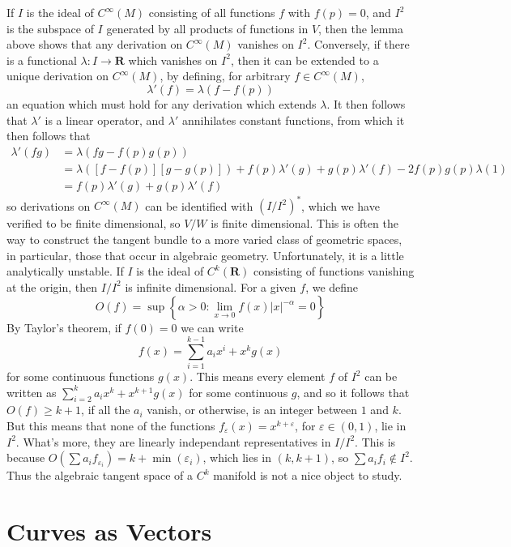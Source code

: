 If $I$ is the ideal of $C^\infty(M)$ consisting of all functions $f$ with $f(p) = 0$, and $I^2$ is the subspace of $I$ generated by all products of functions in $V$, then the lemma above shows that any derivation on $C^\infty(M)$ vanishes on $I^2$. Conversely, if there is a functional $\lambda: I \to \mathbf{R}$ which vanishes on $I^2$, then it can be extended to a unique derivation on $C^\infty(M)$, by defining, for arbitrary $f \in C^\infty(M)$,
%
\[ \lambda'(f) = \lambda(f - f(p)) \]
%
an equation which must hold for any derivation which extends $\lambda$. It then follows that $\lambda'$ is a linear operator, and $\lambda'$ annihilates constant functions, from which it then follows that
%
\begin{align*}
    \lambda'(fg) &= \lambda(fg - f(p)g(p))\\
    &= \lambda([f - f(p)][g - g(p)]) + f(p) \lambda'(g) + g(p) \lambda'(f) - 2 f(p) g(p) \lambda(1)\\
    &= f(p) \lambda'(g) + g(p) \lambda'(f)
\end{align*}
%
so derivations on $C^\infty(M)$ can be identified with $(I/I^2)^*$, which we have verified to be finite dimensional, so $V/W$ is finite dimensional. This is often the way to construct the tangent bundle to a more varied class of geometric spaces, in particular, those that occur in algebraic geometry. Unfortunately, it is a little analytically unstable. If $I$ is the ideal of $C^k(\mathbf{R})$ consisting of functions vanishing at the origin, then $I/I^2$
 is infinite dimensional. For a given $f$, we define
 \[ O(f) = \sup \left\{ \alpha > 0 : \lim_{x \to 0} f(x) |x|^{-\alpha} = 0 \right\} \]
 By Taylor's theorem, if $f(0) = 0$ we can write
 \[ f(x) = \sum_{i = 1}^{k-1} a_i x^i + x^k g(x) \]
 for some continuous functions $g(x)$. This means every element $f$ of $I^2$ can be written as $\sum_{i = 2}^k a_i x^k + x^{k+1} g(x)$ for some continuous $g$, and so it follows that $O(f) \geq k+1$, if all the $a_i$ vanish, or otherwise, is an integer between $1$ and $k$. But this means that none of the functions $f_\varepsilon(x) = x^{k + \varepsilon}$, for $\varepsilon \in (0,1)$, lie in $I^2$. What's more, they are linearly independant representatives in $I/I^2$. This is because $O(\sum a_i f_{\varepsilon_i}) = k + \min(\varepsilon_i)$, which lies in $(k,k+1)$, so $\sum a_i f_i \not \in I^2$. Thus the algebraic tangent space of a $C^k$ manifold is not a nice object to study.

\section{Curves as Vectors}

